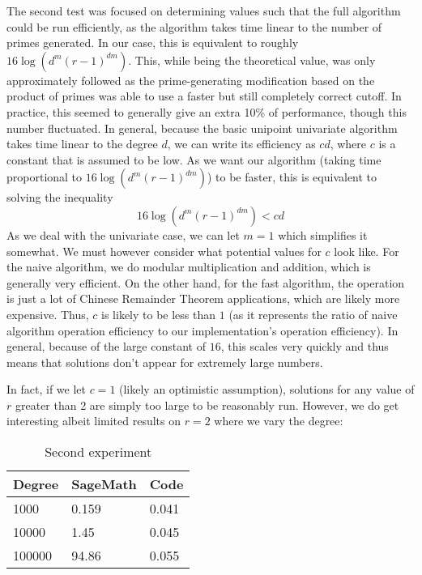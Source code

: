 \documentclass[pageno]{jpaper}
\begin{document}
The second test was focused on determining values such that the full algorithm could be run efficiently, as the algorithm takes time linear to the number of primes generated.
In our case, this is equivalent to roughly $16\log(d^m(r-1)^{dm})$.
This, while being the theoretical value, was only approximately followed as the prime-generating modification based on the product of primes was able to use a faster but still completely correct cutoff.
In practice, this seemed to generally give an extra 10\% of performance, though this number fluctuated.
In general, because the basic unipoint univariate algorithm takes time linear to the degree $d$, we can write its efficiency as $cd$, where $c$ is a constant that is assumed to be low.
As we want our algorithm (taking time proportional to $16\log(d^m(r-1)^{dm})$) to be faster, this is equivalent to solving the inequality
\[16\log(d^m(r-1)^{dm}) < cd\]
As we deal with the univariate case, we can let $m=1$ which simplifies it somewhat.
We must however consider what potential values for $c$ look like.
For the naive algorithm, we do modular multiplication and addition, which is generally very efficient.
On the other hand, for the fast algorithm, the operation is just a lot of Chinese Remainder Theorem applications, which are likely more expensive.
Thus, $c$ is likely to be less than $1$ (as it represents the ratio of naive algorithm operation efficiency to our implementation's operation efficiency).
In general, because of the large constant of $16$, this scales very quickly and thus means that solutions don't appear for extremely large numbers.

In fact, if we let $c=1$ (likely an optimistic assumption), solutions for any value of $r$ greater than 2 are simply too large to be reasonably run.
However, we do get interesting albeit limited results on $r=2$ where we vary the degree:

\begin{table}[!h]
  \centering
  \begin{tabular}{|l|l|l|}
    \hline
    Degree & SageMath & Code  \\ \hline
    1000   & 0.159    & 0.041 \\ \hline
    10000  & 1.45     & 0.045 \\ \hline
    100000 & 94.86    & 0.055 \\ \hline
  \end{tabular}
  \caption{Second experiment}
\end{table}
\end{document}
